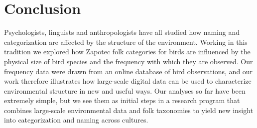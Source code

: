 \documentclass[10pt,letterpaper]{article}
\begin{document}
%
%
%
%
%

\section{Conclusion}

Psychologists, linguists and anthropologists have all studied how naming and categorization are affected by the structure of the environment.  Working in this tradition we explored how Zapotec folk categories for birds are influenced by the physical size of bird species and the frequency with which they are observed. Our frequency data were drawn from an online database of bird observations, and our work therefore illustrates how large-scale digital data can be used to characterize environmental structure in new and useful ways. Our analyses so far have been extremely simple, but we see them as initial steps in a research program that combines large-scale environmental data and folk taxonomies to yield new insight into categorization and naming across cultures. 
\end{document}
